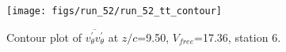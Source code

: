 \begin{figure}[H]
\centering
\texttt{[image: figs/run\_52/run\_52\_tt\_contour]}
\caption{Contour plot of $\overline{v_{\theta}^{\prime} v_{\theta}^{\prime}}$ at $z/c$=9.50, $V_{free}$=17.36, station 6.}
\label{fig:run_52_tt_contour}
\end{figure}


